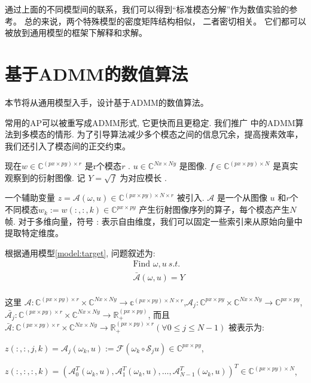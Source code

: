 \documentclass[12pt]{article}
\begin{document}
通过上面的不同模型间的联系，我们可以得到“标准模态分解”作为数值实验的参考。 总的来说，两个特殊模型的密度矩阵结构相似， 二者密切相关。 它们都可以被放到通用模型的框架下解释和求解。


	
	\newpage
\section{基于ADMM的数值算法}

本节将从通用模型入手，设计基于ADMM的数值算法。

常用的AP可以被重写成ADMM形式, 它更快而且更稳定. 我们推广 \cite{admm} 中的ADMM算法到多模态的情形. 为了引导算法减少多个模态之间的信息冗余，提高搜素效率，我们还引入了模态间的正交约束。

现在$w \in \mathbb{C}^{(px\times py) \times r}$ 是r个模态$r$ . $u \in \mathbb{C}^{Nx\times Ny}$ 是图像.  $f \in \mathbb{C}^{(px \times py) \times N}$ 是真实观察到的衍射图像. 记 $Y=\sqrt{f}$ 为对应模长 .

一个辅助变量 $z=\mathcal{A}(\omega, u) \in \mathbb{C}^{(px \times py) \times N \times r}$ 被引入. $\mathcal{A}$ 是一个从图像 $u$ 和$r$个不同模态$w_k:=w(:,:,k) \in \mathbb{C}^{px \times py}$ 产生衍射图像序列的算子，每个模态产生$N$ 帧. 对于多维向量，符号 : 表示自由维度，我们可以固定一些索引来从原始向量中提取特定维度。  

根据通用模型\ref{model:target}, 问题叙述为:
$$
\begin{aligned}
&\mbox{Find } \omega,u \ s.t.\\
& \bar{\mathcal{A}}(\omega, u)=Y\\
\end{aligned}
$$


这里 $\mathcal{A}: \mathbb{C}^{(px\times py)\times r} \times \mathbb{C}^{Nx \times Ny} \rightarrow \mathbb{c}^{(px \times py) \times N \times r}$,$\mathcal{A}_{j}: \mathbb{C}^{px\times py} \times \mathbb{C}^{Nx \times Ny} \rightarrow \mathbb{C}^{px\times py} $,
$\bar{\mathcal{A}_j}:\mathbb{C}^{(px\times py)\times r} \times \mathbb{C}^{Nx \times Ny} \rightarrow \mathbb{R}_+^{(px \times py)}$, 而且 $\bar{\mathcal{A}}:\mathbb{C}^{(px\times py)\times r} \times \mathbb{C}^{Nx \times Ny} \rightarrow \mathbb{R}_+^{(px \times py) \times r} (\forall 0 \leq j \leq N-1)$ 被表示为:

$z(:,:,j,k) = \mathcal{A}_{j}(\omega_k, u):=\mathcal{F}\left(\omega_k \circ \mathcal{S}_{j} u\right) \in \mathbb{C}^{px\times py}$,

$z(:,:,:,k) =\left(\mathcal{A}_{0}^{T}(\omega_k, u), \mathcal{A}_{1}^{T}(\omega_k, u), \ldots, \mathcal{A}_{N-1}^{T}(\omega_k, u)\right)^{T} 
\in \mathbb{C}^{(px\times py) \times N}$,
\end{document}
